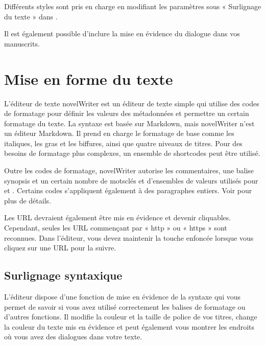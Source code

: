 \documentclass[a4paper,11pt,french]{sphinxmanual}
\begin{document}
\sphinxAtStartPar
Différents styles sont pris en charge en modifiant les paramètres sous « Surlignage du texte » dans .

\sphinxAtStartPar
Il est également possible d’inclure la mise en évidence du dialogue dans vos manuscrits.

\sphinxstepscope


\chapter{Mise en forme du texte}
\label{\detokenize{usage_format:formatting-your-text}}\label{\detokenize{usage_format:a-fmt}}\label{\detokenize{usage_format::doc}}
\sphinxAtStartPar
L’éditeur de texte novelWriter est un éditeur de texte simple qui utilise des codes de formatage pour définir les valeurs des métadonnées et permettre un certain formatage du texte. La syntaxe est basée sur Markdown, mais novelWriter n’est  un éditeur Markdown. Il prend en charge le formatage de base comme les italiques, les gras et les biffures, ainsi que quatre niveaux de titres. Pour des besoins de formatage plus complexes, un ensemble de shortcodes peut être utilisé.

\sphinxAtStartPar
Outre les codes de formatage, novelWriter autorise les commentaires, une balise synopsis et un certain nombre de mots\sphinxhyphen{}clés et d’ensembles de valeurs utilisés pour {\hyperref[\detokenize{int_glossary:term-Tag}]{}} et {\hyperref[\detokenize{int_glossary:term-Reference}]{}}. Certains codes s’appliquent également à des paragraphes entiers. Voir {\hyperref[\detokenize{usage_format:a-fmt-text}]{}} pour plus de détails.

\sphinxAtStartPar
Les URL devraient également être mis en évidence et devenir cliquables. Cependant, seules les URL commençant par « http » ou « https » sont reconnues. Dans l’éditeur, vous devez maintenir la touche  enfoncée lorsque vous cliquez sur une URL pour la suivre.


\section{Surlignage syntaxique}
\label{\detokenize{usage_format:syntax-highlighting}}\label{\detokenize{usage_format:a-fmt-hlight}}
\sphinxAtStartPar
L’éditeur dispose d’une fonction de mise en évidence de la syntaxe qui vous permet de savoir si vous avez utilisé correctement les balises de formatage ou d’autres fonctions. Il modifie la couleur et la taille de police de vos titres, change la couleur du texte mis en évidence et peut également vous montrer les endroits où vous avez des dialogues dans votre texte.
\end{document}
